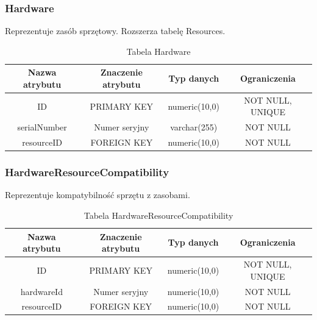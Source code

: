 \subsubsection{Hardware}
Reprezentuje zasób sprzętowy. Rozszerza tabelę Resources.
\begin{table}[H]
	\renewcommand\arraystretch{1.5}
	\renewcommand\tabcolsep{3pt}
	\begin{tabular}{| c | c | c | c |} 
		\hline \textbf{Nazwa atrybutu} & \textbf{Znaczenie atrybutu} & \textbf{Typ danych} & \textbf{Ograniczenia} \\ 
		\hline ID & PRIMARY KEY & numeric(10,0) & NOT NULL, UNIQUE \\ 
		\hline serialNumber & Numer seryjny & varchar(255) & NOT NULL \\ 
		\hline resourceID & FOREIGN KEY & numeric(10,0) & NOT NULL \\ 
		\hline 
	\end{tabular} 
	\caption{Tabela Hardware}
	\label{TAB:Hardware}
\end{table}

\subsubsection{HardwareResourceCompatibility}
Reprezentuje kompatybilność sprzętu z zasobami.
\begin{table}[H]
	\renewcommand\arraystretch{1.5}
	\renewcommand\tabcolsep{3pt}
	\begin{tabular}{| c | c | c | c |} 
		\hline \textbf{Nazwa atrybutu} & \textbf{Znaczenie atrybutu} & \textbf{Typ danych} & \textbf{Ograniczenia} \\ 
		\hline ID & PRIMARY KEY & numeric(10,0) & NOT NULL, UNIQUE \\ 
		\hline hardwareId & Numer seryjny & numeric(10,0) & NOT NULL \\ 
		\hline resourceID & FOREIGN KEY & numeric(10,0) & NOT NULL \\ 
		\hline 
	\end{tabular} 
	\caption{Tabela HardwareResourceCompatibility}
	\label{TAB:HardwareResourceCompatibility}
\end{table}

